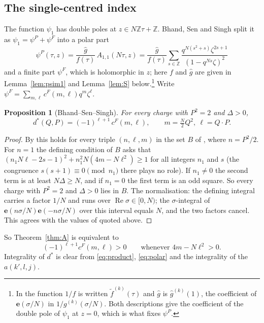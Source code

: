 \documentclass[11pt]{amsart}
\newtheorem{proposition}[theorem]{Proposition}
\theoremstyle{definition}
\newcommand{\ZZ}{\mathbb{Z}}
\newcommand{\e}{\mathbf{e}}
\newcommand{\cF}{c^{F}}
\newcommand{\gh}{\hat g}
\begin{document}
\subsection{The single-centred index}
The function $\psi_1$ has double poles at $z\in N\ZZ\tau+\ZZ$. Bhand, Sen and Singh split it as $\psi_1=\psi^P+\psi^F$ into a polar part \cite[(5.45)]{BSS25}
\begin{equation}\label{eq:polar}
\psi^P(\tau,z)=\frac{\gh}{f(\tau)}\,A_{1,1}(N\tau,z)=\frac{\gh}{f(\tau)}\sum_{s\in\ZZ}\frac{q^{N(s^2+s)}\zeta^{2s+1}}{(1-q^{Ns}\zeta)^2}
\end{equation}
and a finite part $\psi^F$, which is holomorphic in $z$; here $f$ and $\gh$ are given in Lemma~\ref{lem:psim1} and Lemma~\ref{lem:S} below.\footnote{In \cite{BSS25} the function $1/f$ is written $\tilde f^{(k)}(\tau)$ and $\gh$ is $\hat g^{(k)}(1)$, the coefficient of $\e(\sigma/N)$ in $1/g^{(k)}(\sigma/N)$. Both descriptions give the coefficient of the double pole of $\psi_1$ at $z=0$, which is what fixes $\psi^P$.} Write $\psi^F=\sum_{m,\ell}\cF(m,\ell)q^m\zeta^\ell$.

\begin{proposition}[Bhand--Sen--Singh]\label{prop:bss}
For every charge with $P^2=2$ and $\Delta>0$,
\[
d^*(Q,P)=(-1)^{\ell+1}\,\cF(m,\ell),\qquad m=\tfrac N2Q^2,\ \ell=Q\cdot P .
\]
\end{proposition}

\begin{proof}
By \cite[Theorem~5.4(b)]{BSS25} this holds for every triple $(n,\ell,m)$ in the set $B$ of \cite[(5.48)--(5.49)]{BSS25}, where $n=P^2/2$. For $n=1$ the defining condition of $B$ asks that $(n_1N\ell-2s-1)^2+n_1^2N(4m-N\ell^2)\ge1$ for all integers $n_1$ and $s$ (the congruence $s(s+1)\equiv0\pmod{n_1}$ there plays no role). If $n_1\ne0$ the second term is at least $N\Delta\ge N$, and if $n_1=0$ the first term is an odd square. So every charge with $P^2=2$ and $\Delta>0$ lies in $B$. The normalisation: the defining integral \cite[(5.13)]{BSS25} carries a factor $1/N$ and runs over $\operatorname{Re}\sigma\in[0,N)$; the $\sigma$-integral of $\e(n\sigma/N)\e(-n\sigma/N)$ over this interval equals $N$, and the two factors cancel. This agrees with the values of \cite[Tables~2--3]{Sen11} quoted above.
\end{proof}

So Theorem~\ref{thm:A} is equivalent to
\begin{equation}\label{eq:goal}
(-1)^{\ell+1}\cF(m,\ell)>0\qquad\text{whenever }4m-N\ell^2>0 .
\end{equation}
Integrality of $d^*$ is clear from \eqref{eq:product}, \eqref{eq:polar} and the integrality of the $a(k',l,j)$.
\end{document}
